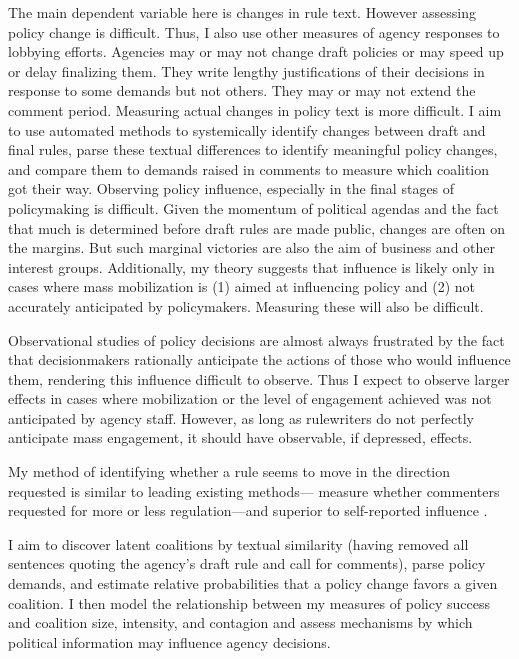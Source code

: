 

The main dependent variable here is changes in rule text. However assessing policy change is difficult. Thus, I also use other measures of agency responses to lobbying efforts. 
Agencies may or may not change draft policies or may speed up or delay finalizing them. They write lengthy justifications of their decisions in response to some demands but not others. They may or may not extend the comment period. Measuring actual changes in policy text is more difficult. I aim to use automated methods to systemically identify changes between draft and final rules, parse these textual differences to identify meaningful policy changes, and compare them to demands raised in comments to measure which coalition got their way.
Observing policy influence, especially in the final stages of policymaking is difficult. Given the momentum of political agendas and the fact that much is determined before draft rules are made public, changes are often on the margins. But such marginal victories are also the aim of business and other interest groups. 
Additionally, my theory suggests that influence is likely only in cases where mass mobilization is (1) aimed at influencing policy and (2) not accurately anticipated by policymakers. Measuring these will also be difficult.



Observational studies of policy decisions are almost always frustrated by the fact that decisionmakers rationally anticipate the actions of those who would influence them, rendering this influence difficult to observe. Thus I expect to observe larger effects in cases where mobilization or the level of engagement achieved was not anticipated by agency staff. However, as long as rulewriters do not perfectly anticipate mass engagement, it should have observable, if depressed, effects. 

My method of identifying whether a rule seems to move in the direction requested is similar to leading existing methods---\citet{Yackee2006JOP} measure whether commenters requested for more or less regulation---and superior to self-reported influence \citep{Furlong1997}.

I aim to discover latent coalitions by textual similarity (having removed all sentences quoting the agency's draft rule and call for comments), parse policy demands, and estimate relative probabilities that a policy change favors a given coalition. I then model the relationship between my measures of policy success and coalition size, intensity, and contagion and assess mechanisms
by which political information may influence agency decisions.

